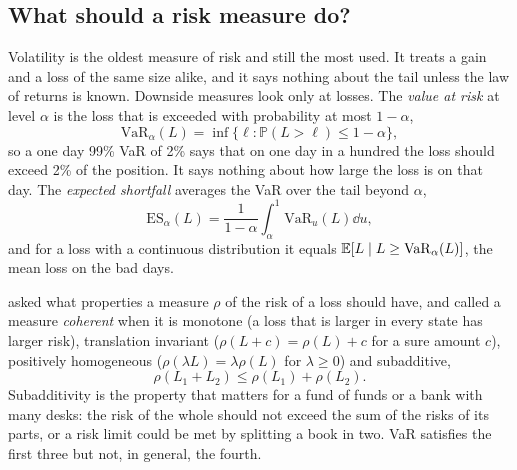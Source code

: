 \begin{chapterrefs}
\FloatBarrier
\section{What should a risk measure do?}
\label{sec8:measures}

Volatility is the oldest measure of risk and still the most used. It treats a gain and a loss of the
same size alike, and it says nothing about the tail unless the law of returns is known. Downside
measures look only at losses. The \emph{value at risk} at level $\alpha$ is the loss that is exceeded
with probability at most $1-\alpha$,
\begin{equation}\label{eq8:var}
  \mathrm{VaR}_\alpha(L) = \inf\{\ell : \mathbb P(L>\ell)\le 1-\alpha\},
\end{equation}
so a one day 99\% VaR of 2\% says that on one day in a hundred the loss should exceed 2\% of the
position. It says nothing about how large the loss is on that day. The \emph{expected shortfall}
averages the VaR over the tail beyond $\alpha$,
\begin{equation}\label{eq8:es}
  \mathrm{ES}_\alpha(L) = \frac{1}{1-\alpha}\int_\alpha^1 \mathrm{VaR}_u(L)\dd u ,
\end{equation}
and for a loss with a continuous distribution it equals $\mathbb{E}[L\mid L\ge\mathrm{VaR}_\alpha(L)]$, the
mean loss on the bad days.

\textcite{artzner1999} asked what properties a measure $\rho$ of the risk of a loss should have, and
called a measure \emph{coherent} when it is monotone (a loss that is larger in every state has larger
risk), translation invariant ($\rho(L+c)=\rho(L)+c$ for a sure amount $c$), positively homogeneous
($\rho(\lambda L)=\lambda\rho(L)$ for $\lambda\ge0$) and subadditive,
\begin{equation}\label{eq8:subadd}
  \rho(L_1+L_2)\le\rho(L_1)+\rho(L_2).
\end{equation}
Subadditivity is the property that matters for a fund of funds or a bank with many desks: the risk of
the whole should not exceed the sum of the risks of its parts, or a risk limit could be met by
splitting a book in two. VaR satisfies the first three but not, in general, the fourth.


\end{chapterrefs}
